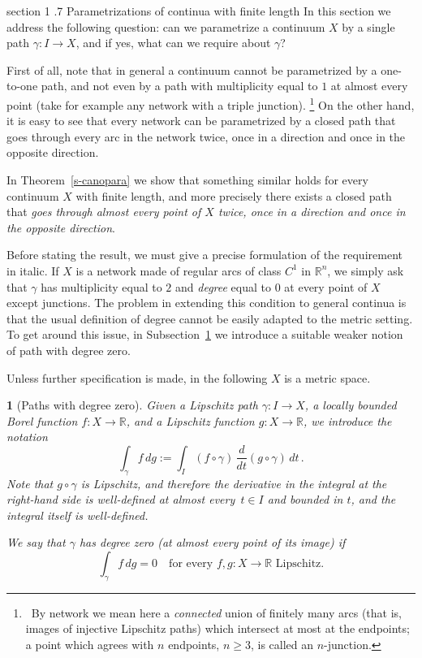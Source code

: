 \documentclass[11pt,reqno,a4paper,final]{amsart}
\makeatletter
\numberwithin{equation}{section}
\theoremstyle{mytheorem}
\theoremstyle{myremark}
\theoremstyle{myparagraph}
\newtheorem{parag}[subsection]{}
\def\section{\@startsection%
{section}%
{1}%
\z@{1.5\linespacing\@plus .2\linespacing}%
  {.7\linespacing}%
  {\normalfont\sc\centering}}%
\newcommand{\footnoteb}[1]{\footnote{~#1}}
\newcommand{\R}{\mathbb{R}}
\makeatother
\begin{document}
\section{Parametrizations of continua with finite length}
\label{s4}
In this section we address the following question: can we parametrize
a continuum $X$ by a single path $\gamma:I\to X$, and if yes, 
what can we require about $\gamma$?

First of all, note that in general a continuum cannot be 
parametrized by a one-to-one path, and not even by a path
with multiplicity equal to $1$ at almost every point
(take for example any network with a triple junction).%
%
\footnoteb{By network we mean here a \emph{connected} union of finitely many 
arcs (that is, images of injective Lipschitz paths) which intersect 
at most at the endpoints; a point which agrees with $n$ endpoints, $n\ge 3$, 
is called an $n$-junction.}
% 
On the other hand, it is easy to see that every network can be 
parametrized by a closed path that goes through every
arc in the network twice, once in a direction and once 
in the opposite direction.

In Theorem~\ref{s-canopara} we show that 
something similar holds for every continuum $X$ with finite length, 
and more precisely there exists a closed path that \emph{goes through almost 
every point of $X$ twice, once in a direction and once in the opposite direction}.

Before stating the result, we must give a precise formulation of 
the requirement in italic. 
If $X$ is a network made of regular arcs of class $C^1$ in $\R^n$, 
we simply ask that $\gamma$ has multiplicity equal to $2$ and 
\emph{degree} equal to $0$ 
at every point of $X$ except junctions. The problem in extending this
condition to general continua is that the usual definition 
of degree cannot be easily adapted to the metric setting.
To get around this issue, in Subsection~\ref{s-degzero} we introduce 
a suitable weaker notion of path with degree zero.

\medskip
Unless further specification is made, 
in the following $X$ is a metric space.

\begin{parag}[Paths with degree zero]
\label{s-degzero}
Given a Lipschitz path $\gamma:I\to X$, a locally bounded 
Borel function $f:X\to\R$, and a Lipschitz function $g:X\to\R$, 
we introduce the notation
%
\begin{equation}
\label{e-intform}
\int_\gamma f \, dg
:= \int_I (f\circ\gamma) \, \frac{d}{dt} (g\circ\gamma) \, dt
\, .
\end{equation}
%
Note that $g\circ\gamma$ is Lipschitz, and therefore 
the derivative in the integral at the right-hand side is well-defined
at almost every~$t\in I$ and bounded in $t$, and  
the integral itself is well-defined.

We say that $\gamma$ has \emph{degree zero} (at almost every 
point of its image) if 
%
\begin{equation}
\label{e-degzero}
\int_\gamma f \, dg = 0
\quad\text{for every $f, g:X\to\R$ Lipschitz.}
\end{equation}
%
\end{parag}
\end{document}
